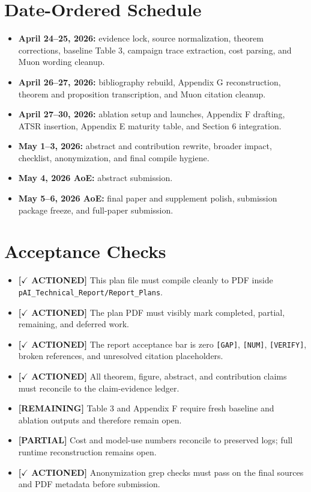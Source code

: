 \documentclass[11pt]{article}
\newcommand{\actioned}{\textbf{\textcolor{green!45!black}{[$\checkmark$ ACTIONED]}}}
\newcommand{\partialdone}{\textbf{\textcolor{orange!75!black}{[PARTIAL]}}}
\newcommand{\remaining}{\textbf{\textcolor{red!65!black}{[REMAINING]}}}
\begin{document}
\section*{Date-Ordered Schedule}
\begin{itemize}
  \item \textbf{April 24--25, 2026:} evidence lock, source normalization, theorem corrections, baseline Table 3, campaign trace extraction, cost parsing, and Muon wording cleanup.
  \item \textbf{April 26--27, 2026:} bibliography rebuild, Appendix G reconstruction, theorem and proposition transcription, and Muon citation cleanup.
  \item \textbf{April 27--30, 2026:} ablation setup and launches, Appendix F drafting, ATSR insertion, Appendix E maturity table, and Section 6 integration.
  \item \textbf{May 1--3, 2026:} abstract and contribution rewrite, broader impact, checklist, anonymization, and final compile hygiene.
  \item \textbf{May 4, 2026 AoE:} abstract submission.
  \item \textbf{May 5--6, 2026 AoE:} final paper and supplement polish, submission package freeze, and full-paper submission.
\end{itemize}

\section*{Acceptance Checks}
\begin{itemize}
  \item \actioned{} This plan file must compile cleanly to PDF inside \texttt{pAI\_Technical\_Report/Report\_Plans}.
  \item \actioned{} The plan PDF must visibly mark completed, partial, remaining, and deferred work.
  \item \actioned{} The report acceptance bar is zero \texttt{[GAP]}, \texttt{[NUM]}, \texttt{[VERIFY]}, broken references, and unresolved citation placeholders.
  \item \actioned{} All theorem, figure, abstract, and contribution claims must reconcile to the claim-evidence ledger.
  \item \remaining{} Table 3 and Appendix F require fresh baseline and ablation outputs and therefore remain open.
  \item \partialdone{} Cost and model-use numbers reconcile to preserved logs; full runtime reconstruction remains open.
  \item \actioned{} Anonymization grep checks must pass on the final sources and PDF metadata before submission.
\end{itemize}
\end{document}
